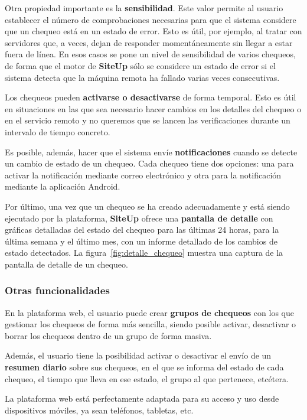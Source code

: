 \documentclass[a4paper,12pt]{article}
\begin{document}
Otra propiedad importante es la \textbf{sensibilidad}. Este valor permite al
usuario establecer el número de comprobaciones necesarias para que el sistema
considere que un chequeo está en un estado de error. Esto es útil, por ejemplo,
al tratar con servidores que, a veces, dejan de responder momentáneamente sin
llegar a estar fuera de línea. En esos casos se pone un nivel de sensibilidad de
varios chequeos, de forma que el motor de \textbf{SiteUp} sólo se considere un
estado de error si el sistema detecta que la máquina remota ha fallado varias
veces consecutivas.

Los chequeos pueden \textbf{activarse o desactivarse} de forma temporal. Esto es
útil en situaciones en las que sea necesario hacer cambios en los detalles del
chequeo o en el servicio remoto y no queremos que se lancen las verificaciones
durante un intervalo de tiempo concreto. 

Es posible, además, hacer que el sistema envíe \textbf{notificaciones} cuando se
detecte un cambio de estado de un chequeo. Cada chequeo tiene dos opciones: una
para activar la notificación mediante correo electrónico y otra para la
notificación mediante la aplicación Android.

Por último, una vez que un chequeo se ha creado adecuadamente y está siendo
ejecutado por la plataforma, \textbf{SiteUp} ofrece una \textbf{pantalla de
  detalle} con gráficas detalladas del estado del chequeo para las últimas 24
horas, para la última semana y el último mes, con un informe detallado de los
cambios de estado detectados. La figura~\ref{fig:detalle_chequeo} muestra una
captura de la pantalla de detalle de un chequeo.

\subsubsection{Otras funcionalidades}

En la plataforma web, el usuario puede crear \textbf{grupos de chequeos} con los
que gestionar los chequeos de forma más sencilla, siendo posible activar,
desactivar o borrar los chequeos dentro de un grupo de forma masiva.

Además, el usuario tiene la posibilidad activar o desactivar el envío de un
\textbf{resumen diario} sobre sus chequeos, en el que se informa del estado de
cada chequeo, el tiempo que lleva en ese estado, el grupo al que pertenece,
etcétera.

La plataforma web está perfectamente adaptada para su acceso y uso desde
dispositivos móviles, ya sean teléfonos, tabletas, etc.
\end{document}
